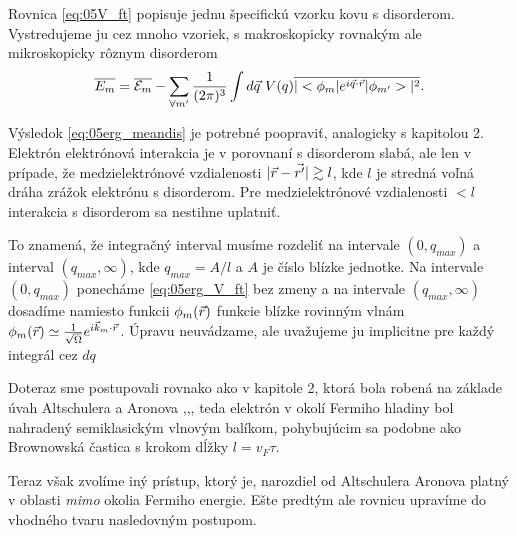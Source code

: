 Rovnica \eqref{eq:05V_ft} popisuje jednu špecifickú vzorku kovu s disorderom.  Vystredujeme ju cez mnoho vzoriek, s makroskopicky rovnakým ale mikroskopicky rôznym disorderom
\begin{equation}
\label{eq:05erg_meandis}
 \overline{E_m}=\overline{\mathcal{E}_m}-\sum_{\forall m'} \frac{1}{(2\pi)^{3}} \int d\vec{q}\ V(q) \overline{|<\phi_m|e^{i\vec{q}\cdot\vec{r}}|\phi_{m'}>|^2} \text{.}
\end{equation}

Výsledok \eqref{eq:05erg_meandis}  je potrebné poopraviť, analogicky s kapitolou 2. Elektrón elektrónová interakcia je v porovnaní s disorderom slabá, ale len v prípade, že medzielektrónové vzdialenosti $|\vec{r}-\vec{r'}|\gtrsim l$, kde $l$ je stredná voľná dráha zrážok elektrónu s disorderom. Pre medzielektrónové vzdialenosti $< l$ interakcia s disorderom sa nestihne uplatniť.

To znamená, že integračný interval musíme rozdeliť na intervale  $(0, q_{max})$ a interval $(q_{max}, \infty)$, kde $q_{max}=A/l$ a $A$ je číslo blízke jednotke.
Na intervale  $(0, q_{max})$ ponecháme \eqref{eq:05erg_V_ft} bez zmeny a na intervale  $(q_{max}, \infty)$ dosadíme namiesto funkcii $\phi_m(\vec{r})$ funkcie blízke rovinným vlnám  $\phi_m(\vec{r}) \simeq \frac{1}{\sqrt \Omega}e^{i\vec{k}_m\cdot\vec{r}}$. Úpravu neuvádzame, ale uvažujeme ju implicitne pre každý integrál cez $dq$

Doteraz sme postupovali rovnako ako v kapitole 2, ktorá bola robená na základe úvah Altschulera a Aronova  \cite{Altshuler1},\cite{Altshuler3},\cite{Altshuler4}, teda elektrón v okolí Fermiho hladiny bol nahradený semiklasickým vlnovým balíkom, pohybujúcim sa podobne ako Brownowská častica s krokom dĺžky $l=v_F\tau$. 

Teraz však zvolíme iný prístup, ktorý je, narozdiel od Altschulera Aronova platný v oblasti {\it mimo} okolia Fermiho energie. Ešte predtým ale rovnicu upravíme do vhodného tvaru nasledovným postupom.

